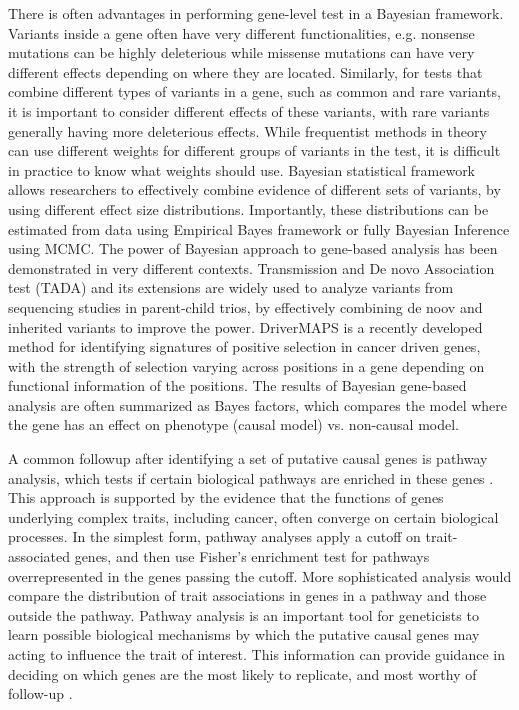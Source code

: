 There is often advantages in performing gene-level test in a Bayesian framework. Variants inside a gene often have very different functionalities, e.g. nonsense mutations can be highly deleterious while missense mutations can have very different effects depending on where they are located. Similarly, for tests that combine different types of variants in a gene, such as common and rare variants, it is important to consider different effects of these variants, with rare variants generally having more deleterious effects. While frequentist methods in theory can use different weights for different groups of variants in the test, it is difficult in practice to know what weights should use. Bayesian statistical framework allows researchers to effectively combine evidence of different sets of variants, by using different effect size distributions. Importantly, these distributions can be estimated from data using Empirical Bayes framework or fully Bayesian Inference using MCMC. The power of Bayesian approach to gene-based analysis has been demonstrated in very different contexts. Transmission and De novo Association test (TADA) and its extensions \cite{TADA} are widely used to analyze variants from sequencing studies in parent-child trios, by effectively combining de noov and inherited variants to improve the power. DriverMAPS is a recently developed method for identifying signatures of positive selection in cancer driven genes, with the strength of selection varying across positions in a gene depending on functional information of the positions\cite{drivermaps}. The results of Bayesian gene-based analysis are often summarized as Bayes factors, which compares the model where the gene has an effect on phenotype (causal model) vs. non-causal model.  

A common followup after identifying a set of putative causal genes is pathway analysis, which tests if certain biological pathways are enriched in these genes \cite{rss-e}\cite{Carbonetto_2013}\cite{Lamparter_2016}. This approach is supported by the evidence that the functions of genes underlying complex traits, including cancer, often converge on certain biological processes. In the simplest form, pathway analyses apply a cutoff on trait-associated genes, and then use Fisher's enrichment test for pathways overrepresented in the genes passing the cutoff. More sophisticated analysis would compare the distribution of trait associations in genes in a pathway and those outside the pathway. Pathway analysis is an important tool for geneticists to learn possible biological mechanisms by which the putative causal genes may acting to influence the trait of interest. This information can provide guidance in deciding on which genes are the most likely to replicate, and most worthy of follow-up \cite{Hou_2013}.


